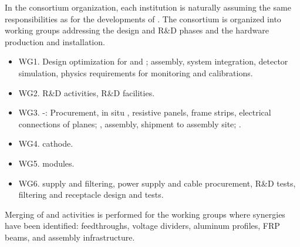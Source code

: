 In the  consortium organization, each institution is naturally assuming the same responsibilities as for the developments of . The consortium is organized into working groups addressing the design and  R\&D phases and the hardware production and installation.

\begin{itemize}
\item WG1. Design optimization for  and ; assembly, system integration, detector simulation, physics requirements for monitoring and calibrations. %
\item WG2. R\&D activities, R\&D facilities. %
\item WG3. -: Procurement, in situ , resistive panels, frame strips, electrical connections of planes; , assembly, shipment to assembly site; . %
\item WG4.  cathode.%
\item WG5.  modules. %
\item WG6.  supply and filtering,  power supply and cable procurement, R\&D tests, filtering and receptacle design and tests. %
\end{itemize}

\noindent Merging of  and  activities is performed for the working groups where synergies have been identified:  feedthroughs, voltage dividers, aluminum profiles, FRP beams, and assembly infrastructure.


